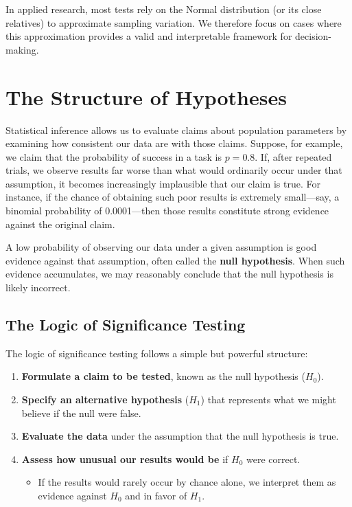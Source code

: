 \documentclass[
  letterpaper,
  DIV=11,
  numbers=noendperiod]{scrreprt}
\providecommand{\tightlist}{%
  \setlength{\itemsep}{0pt}\setlength{\parskip}{0pt}}
\begin{document}
In applied research, most tests rely on the Normal distribution (or its
close relatives) to approximate sampling variation. We therefore focus
on cases where this approximation provides a valid and interpretable
framework for decision-making.

\section{The Structure of Hypotheses}\label{the-structure-of-hypotheses}

Statistical inference allows us to evaluate claims about population
parameters by examining how consistent our data are with those claims.
Suppose, for example, we claim that the probability of success in a task
is \(p = 0.8\). If, after repeated trials, we observe results far worse
than what would ordinarily occur under that assumption, it becomes
increasingly implausible that our claim is true. For instance, if the
chance of obtaining such poor results is extremely small---say, a
binomial probability of 0.0001---then those results constitute strong
evidence against the original claim.

A low probability of observing our data under a given assumption is good
evidence against that assumption, often called the \textbf{null
hypothesis}. When such evidence accumulates, we may reasonably conclude
that the null hypothesis is likely incorrect.

\subsection{The Logic of Significance
Testing}\label{the-logic-of-significance-testing-1}

The logic of significance testing follows a simple but powerful
structure:

\begin{enumerate}
\def\labelenumi{\arabic{enumi}.}
\item
  \textbf{Formulate a claim to be tested}, known as the null hypothesis
  (\(H_0\)).
\item
  \textbf{Specify an alternative hypothesis} (\(H_1\)) that represents
  what we might believe if the null were false.
\item
  \textbf{Evaluate the data} under the assumption that the null
  hypothesis is true.
\item
  \textbf{Assess how unusual our results would be} if \(H_0\) were
  correct.

  \begin{itemize}
  \tightlist
  \item
    If the results would rarely occur by chance alone, we interpret them
    as evidence against \(H_0\) and in favor of \(H_1\).
  \end{itemize}
\end{enumerate}
\end{document}

